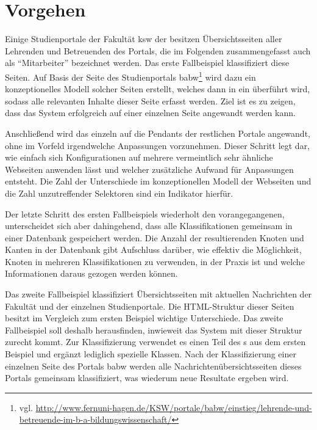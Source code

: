 \section{Vorgehen}
    \label{section:findingsMethod}
    Einige Studienportale der Fakultät \gls{ksw} der {\fernUni}
    besitzen Übersichtsseiten aller Lehrenden und Betreuenden des Portals,
    die im Folgenden zusammengefasst auch als "`Mitarbeiter"' bezeichnet werden.
    Das erste Fallbeispiel klassifiziert diese Seiten.
    Auf Basis der Seite des Studienportals
    \gls{babw}\footnote{vgl. \url{http://www.fernuni-hagen.de/KSW/portale/babw/einstieg/lehrende-und-betreuende-im-b-a-bildungswissenschaft/}}
    wird dazu ein konzeptionelles Modell solcher Seiten erstellt,
    welches dann in ein {\classificationModel} überführt wird,
    sodass alle relevanten Inhalte dieser Seite erfasst werden.
    Ziel ist es zu zeigen, dass das System erfolgreich auf einer einzelnen Seite angewandt werden kann.

    Anschließend wird das {\classificationModel} einzeln auf die Pendants der restlichen Portale angewandt,
    ohne im Vorfeld irgendwelche Anpassungen vorzunehmen.
    Dieser Schritt legt dar, wie einfach sich Konfigurationen auf mehrere vermeintlich
    sehr ähnliche Webseiten anwenden lässt und welcher zusätzliche Aufwand für Anpassungen entsteht.
    Die Zahl der Unterschiede im konzeptionellen Modell der Webseiten und die Zahl unzutreffender Selektoren sind ein Indikator hierfür.

    Der letzte Schritt des ersten Fallbeispiels wiederholt den vorangegangenen,
    unterscheidet sich aber dahingehend, dass alle Klassifikationen
    gemeinsam in einer Datenbank gespeichert werden.
    Die Anzahl der resultierenden Knoten und Kanten in der Datenbank
    gibt Aufschluss darüber, wie effektiv die Möglichkeit, Knoten in mehreren Klassifikationen
    zu verwenden, in der Praxis ist und welche Informationen daraus gezogen werden können.

    Das zweite Fallbeispiel klassifiziert Übersichtsseiten mit aktuellen Nachrichten
    der Fakultät und der einzelnen Studienportale.
    Die HTML-Struktur dieser Seiten besitzt im Vergleich zum ersten Beispiel wichtige Unterschiede.
    Das zweite Fallbeispiel soll deshalb herausfinden, inwieweit das System mit dieser Struktur zurecht kommt.
    Zur Klassifizierung verwendet es einen Teil des {\classificationModel}s aus dem ersten Beispiel
    und ergänzt lediglich spezielle Klassen.
    Nach der Klassifizierung einer einzelnen Seite des Portals \gls{babw}
    werden alle Nachrichtenübersichtsseiten dieses Portals gemeinsam klassifiziert,
    was wiederum neue Resultate ergeben wird.

